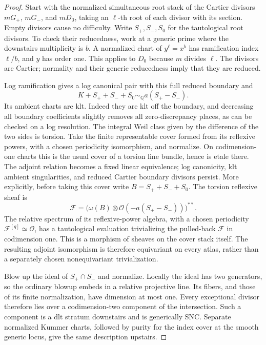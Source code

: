 \documentclass[11pt,letterpaper]{article}
\newcommand{\Q}{\mathbb{Q}}
\newcommand{\OO}{\mathcal{O}}
\theoremstyle{definition}
\theoremstyle{remark}
\begin{document}
\begin{proof}
Start with the normalized simultaneous root stack of the Cartier
divisors $mG_+$, $mG_-$, and $mD_0$, taking an $\ell$-th root of
each divisor with its section.  Empty divisors cause no difficulty.
Write $S_+,S_-,S_0$ for the tautological root divisors.
To check their reducedness, work at a generic prime where the
downstairs multiplicity is $b$.  A normalized chart of
$y^\ell=x^b$ has ramification index $\ell/b$, and $y$ has order
one.  This applies to $D_0$ because $m$ divides $\ell$.
The divisors are Cartier; normality and their generic
reducedness imply that they are reduced.

Log ramification gives a log canonical pair with this full
reduced boundary and
\[
 K+S_++S_-+S_0\sim_{\Q}a(S_+-S_-).
\]
Its ambient charts are klt.  Indeed they are klt off the boundary,
and decreasing all boundary coefficients slightly removes all
zero-discrepancy places, as can be checked on a log resolution.
The integral Weil class given by the difference of the two
sides is torsion.  Take the finite representable cover formed
from its reflexive powers, with a chosen periodicity
isomorphism, and normalize.  On codimension-one charts this is
the usual cover of a torsion line bundle, hence is etale there.
The adjoint relation becomes a fixed linear equivalence;
log canonicity, klt ambient singularities, and reduced Cartier
boundary divisors persist.
More explicitly, before taking this cover write
$B=S_++S_-+S_0$.  The torsion reflexive sheaf is
\[
 \mathcal F=
 \bigl(\omega(B)\otimes\OO(-a(S_+-S_-))\bigr)^{**}.
\]
The relative spectrum of its reflexive-power algebra, with a
chosen periodicity $\mathcal F^{[q]}\simeq\OO$, has a
tautological evaluation trivializing the pulled-back
$\mathcal F$ in codimension one.  This is a morphism of
sheaves on the cover stack itself.  The resulting adjoint
isomorphism is therefore equivariant on every atlas, rather
than a separately chosen nonequivariant trivialization.

Blow up the ideal of $S_+\cap S_-$ and normalize.  Locally the
ideal has two generators, so the ordinary blowup embeds in a
relative projective line.  Its fibers, and those of its finite
normalization, have dimension at most one.  Every exceptional
divisor therefore lies over a codimension-two component of the
intersection.  Such a component is a dlt stratum downstairs and
is generically SNC.  Separate normalized Kummer charts, followed
by purity for the index cover at the smooth generic locus,
give the same description upstairs.


\end{proof}
\end{document}
